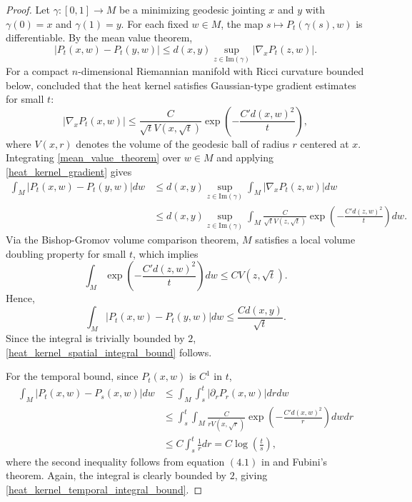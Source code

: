 \documentclass[12pt]{amsart}
\numberwithin{equation}{section}
\newcommand{\1}{\mathbf{1}}
\begin{document}
\begin{proof}
    Let $\gamma:[0,1]\to M$ be a minimizing geodesic jointing $x$ and $y$ with $\gamma(0)=x$ and $\gamma(1)=y$. For each fixed $w\in M$, the map $s\mapsto P_t(\gamma(s),w)$ is differentiable. By the mean value theorem,
    \begin{equation}
    \label{mean_value_theorem}
        \vert P_t(x,w)-P_t(y,w)\vert\leq d(x,y)\sup_{z\in \text{Im}(\gamma)}\vert\nabla_xP_t(z,w)\vert.
    \end{equation}
For a compact $n$-dimensional Riemannian manifold with Ricci curvature bounded below, \cite{10.1007/BF02399203} concluded that the heat kernel satisfies Gaussian-type gradient estimates for small $t$:
\begin{equation}
\label{heat_kernel_gradient}
    \vert\nabla_xP_t(x,w)\vert\leq \frac{C}{\sqrt{t}V(x,\sqrt{t})}\exp\left(-\frac{C'd(x,w)^2}{t}\right),
\end{equation}
where $V(x,r)$ denotes the volume of the geodesic ball of radius $r$ centered at $x$. Integrating \eqref{mean_value_theorem} over $w \in M$ and applying \eqref{heat_kernel_gradient} gives
\begin{equation*}
\begin{split}
        \int_M\vert P_t(x,w)-P_t(y,w)\vert dw&\leq d(x,y)\sup_{z\in \text{Im}(\gamma)}\int_M\vert\nabla_xP_t(z,w)\vert dw\\
    &\leq d(x,y)\sup_{z\in \text{Im}(\gamma)}\int_M\frac{C}{\sqrt{t}V(z,\sqrt{t})}\exp\left(-\frac{C'd(z,w)^2}{t}\right) dw.
\end{split}
\end{equation*}
Via the Bishop-Gromov volume comparison theorem, $M$ satisfies a local volume doubling property for small $t$, which implies
\begin{equation*}
    \int_M\exp\left(-\frac{C'd(z,w)^2}{t}\right) dw\leq CV(z,\sqrt{t}).
\end{equation*}
Hence,
\begin{equation*}
    \int_M\vert P_t(x,w)-P_t(y,w)\vert dw\leq \frac{Cd(x,y)}{\sqrt{t}}.
\end{equation*}
Since the integral is trivially bounded by $2$, \eqref{heat_kernel_spatial_integral_bound} follows.

For the temporal bound, since $P_t(x,w)$ is $C^1$ in $t$,
\begin{equation*}
\begin{split}
        \int_M\vert P_t(x,w)-P_s(x,w)\vert dw &\leq \int_M\int_s^t\vert \partial_rP_r(x,w)\vert drdw\\
        &\leq \int_{s}^{t}\int_M\frac{C}{rV(x,\sqrt{r})}\exp\left(-\frac{C'd(x,w)^2}{r}\right)dwdr\\
        &\leq C\int_s^t\frac{1}{r}dr= C\log\left(\frac{t}{s}\right),
\end{split}
\end{equation*}
where the second inequality follows from equation $(4.1)$ in \cite{coulhon2020gradient} and Fubini's theorem. Again, the integral is clearly bounded by $2$, giving \eqref{heat_kernel_temporal_integral_bound}.
\end{proof}
\end{document}
